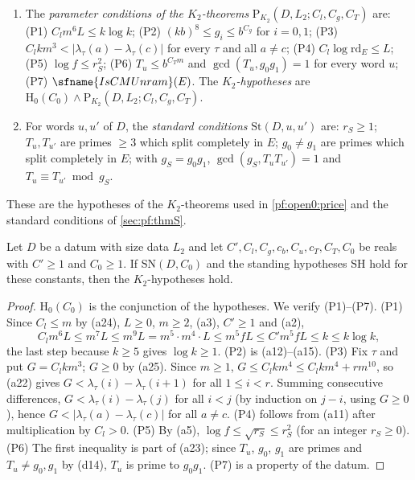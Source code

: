 \begin{definition}\label{pf:sh-misc:k2def}
\begin{enumerate}[label=(\alph*)]
\item The \emph{parameter conditions of the $K_2$-theorems} $\mathrm{P}_{K_2}(D,L_2;C_l,C_g,C_T)$ are: (P1)
$C_lm^6L\le k\log k$; (P2) $(kb)^8\le g_i\le b^{C_g}$ for $i=0,1$; (P3) $C_lkm^3<|\lambda_\tau(a)-\lambda_\tau(c)|$ for every $\tau$
and all $a\ne c$; (P4) $C_l\log\mathrm{rd}_E\le L$; (P5) $\log f\le r_S^2$; (P6) $T_u\le b^{C_Tm}$ and $\gcd(T_u,g_0g_1)=1$ for every
word $u$; (P7) $\sfname{IsCMUnram}(E)$. The \emph{$K_2$-hypotheses} are $\mathrm{H}_0(C_0)\wedge\mathrm{P}_{K_2}(D,L_2;C_l,C_g,C_T)$.
\item For words $u,u'$ of $D$, the \emph{standard conditions} $\mathrm{St}(D,u,u')$ are: $r_S\ge1$; $T_u,T_{u'}$ are primes
$\ge3$ which split completely in $E$; $g_0\ne g_1$ are primes which split completely in $E$; with $g_S=g_0g_1$,
$\gcd(g_S,T_uT_{u'})=1$ and $T_u\equiv T_{u'}\bmod g_S$.
\end{enumerate}
\end{definition}

These are the hypotheses of the $K_2$-theorems used in \cref{pf:open0:price} and the standard conditions of
\cref{sec:pf:thmS}.

\begin{lemma}\label{pf:sh-misc:hypof}
Let $D$ be a datum with size data $L_2$ and let $C',C_l,C_g,c_b,C_u,c_T,C_T,C_0$ be reals with $C'\ge1$ and $C_0\ge1$. If
$\mathrm{SN}(D,C_0)$ and the standing hypotheses $\mathrm{SH}$ hold for these constants, then the $K_2$-hypotheses hold.
\end{lemma}

\begin{proof}
$\mathrm{H}_0(C_0)$ is the conjunction of the hypotheses. We verify (P1)--(P7).
(P1) Since $C_l\le m$ by (a24), $L\ge0$, $m\ge2$, (a3), $C'\ge1$ and (a2),
\[
C_lm^6L\le m^7L\le m^9L=m^5\cdot m^4\cdot L\le m^5fL\le C'm^5fL\le k\le k\log k,
\]
the last step because $k\ge5$ gives $\log k\ge1$.
(P2) is (a12)--(a15).
(P3) Fix $\tau$ and put $G=C_lkm^3$; $G\ge0$ by (a25). Since $m\ge1$, $G\le C_lkm^4\le C_lkm^4+rm^{10}$, so (a22) gives
$G<\lambda_\tau(i)-\lambda_\tau(i+1)$ for all $1\le i<r$. Summing consecutive differences, $G<\lambda_\tau(i)-\lambda_\tau(j)$ for all
$i<j$ (by induction on $j-i$, using $G\ge0$), hence $G<|\lambda_\tau(a)-\lambda_\tau(c)|$ for all $a\ne c$.
(P4) follows from (a11) after multiplication by $C_l>0$.
(P5) By (a5), $\log f\le\sqrt{r_S}\le r_S^2$ (for an integer $r_S\ge0$).
(P6) The first inequality is part of (a23); since $T_u$, $g_0$, $g_1$ are primes and $T_u\ne g_0,g_1$ by (d14), $T_u$ is prime to
$g_0g_1$.
(P7) is a property of the datum.
\end{proof}

